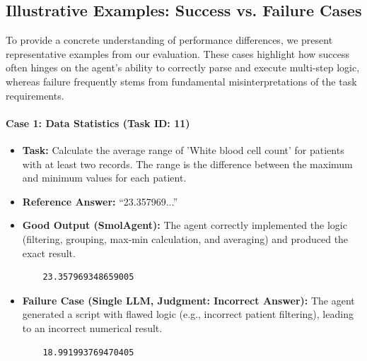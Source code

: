 \documentclass{article}
\begin{document}
\subsection{Illustrative Examples: Success vs. Failure Cases}
To provide a concrete understanding of performance differences, we present representative examples from our evaluation. These cases highlight how success often hinges on the agent's ability to correctly parse and execute multi-step logic, whereas failure frequently stems from fundamental misinterpretations of the task requirements.

\paragraph{Case 1: Data Statistics (Task ID: 11)}
\begin{itemize}
    \item \textbf{Task:} Calculate the average range of 'White blood cell count' for patients with at least two records. The range is the difference between the maximum and minimum values for each patient.
    \item \textbf{Reference Answer:} ``23.357969...''
    \item \textbf{Good Output (SmolAgent):} The agent correctly implemented the logic (filtering, grouping, max-min calculation, and averaging) and produced the exact result.
    \begin{verbatim}
    23.357969348659005
    \end{verbatim}
    \item \textbf{Failure Case (Single LLM, Judgment: Incorrect Answer):} The agent generated a script with flawed logic (e.g., incorrect patient filtering), leading to an incorrect numerical result.
    \begin{verbatim}
    18.991993769470405
    \end{verbatim}
\end{itemize}
\end{document}
